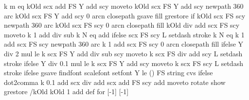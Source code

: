 {{{      k m eq {kOld scx \psFunc@radiusout add FS Y add scy moveto  kOld scx FS Y add scy  newpath  360 arc kOld scx FS Y add scy  0 arcn closepath
      gsave \pst@usecolor\psk@LineEndColorR fill grestore } if
        kOld scx FS scy newpath  360 arc kOld scx FS scy  0 arcn closepath \pst@usecolor\psk@LineEndColorL fill %
       \fi
      kOld \ifPst@LineEnding\psFunc@radiusout\pst@number\psxunit div add \fi
      scx FS scy moveto
      k 1 add
      \ifPst@LineEnding\psFunc@radiusout\pst@number\psxunit div sub \fi
       k N eq
      { \psFunc@rightEnd add }
      { } ifelse
      scx FS scy L \pst@usecolor{} setdash stroke
      \ifPst@LineEnding
      k N eq
      { }
      { k 1 add scx FS scy newpath  360 arc k 1 add scx FS scy  0 arcn closepath \pst@usecolor\psk@LineEndColorR fill }
      ifelse
        \ifPst@VLines
        Y \psFunc@radiusout\pst@number\psyunit div 2 mul le
        { }
        {  k scx FS Y add \psFunc@radiusout\pst@number\psyunit div sub scy moveto k scx FS \psFunc@radiusout\pst@number\psyunit div add scy L \pst@usecolor{} setdash stroke } ifelse \fi
      \else
      \ifPst@VLines
      Y \psFunc@radiusout\pst@number\psyunit div 0.1 mul le
      { }
      { k scx FS Y add scy moveto k scx FS scy L \pst@usecolor{} setdash stroke } ifelse
     \fi\fi\fi
      \ifPst@printValue
        gsave \psk@PSfont\space findfont \psk@fontscale scalefont setfont \pst@usecolor\psk@LabelColor %
        Y \psFunc@PrintVLimit le { () } { FS \psk@valuewidth\space string cvs } ifelse
         \ifPst@comma dot2comma \fi
        k 0.1 add scx  div add \psFunc@xlabelsep scx add
        FS  scy \pst@number\pslabelsep add moveto
        \psFunc@langle rotate show grestore
      \fi
      /kOld kOld 1 add def
    } for
  }%
  \end@OpenObj
}%
%
%
[-1]{\def\psFunc@LeftClipX{#1 }}
[-1]{\def\psFunc@RightClipX{#1 }}
\def\psBinomialC{\pst@object{psBinomialC}}
